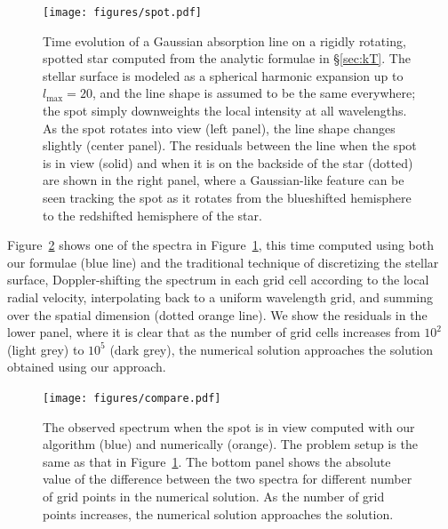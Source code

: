 \documentclass[modern]{aastex631}
\begin{document}
\begin{figure}[p!]
    \begin{centering}
        \texttt{[image: figures/spot.pdf]}
        \caption{%
            Time evolution of a Gaussian absorption line on a rigidly rotating, spotted star computed from the analytic formulae in \S\ref{sec:kT}.
            The stellar surface is modeled as a spherical harmonic expansion up to $l_\mathrm{max}=20$, and the line shape is assumed to be the same everywhere;
            the spot simply downweights the local intensity at all wavelengths.
            As the spot rotates into view (left panel), the line shape changes slightly (center panel). 
            The residuals between the line when the spot is in view (solid) and when it is on the backside of the star (dotted) are shown in the right panel, where a Gaussian-like feature can be seen tracking the spot as it rotates from the blueshifted hemisphere to the redshifted hemisphere of the star.
        }
        \label{fig:spot}
    \end{centering}
\end{figure}

Figure~\ref{fig:compare} shows one of the spectra in Figure~\ref{fig:spot}, this time computed using both our formulae (blue line) and the traditional technique of discretizing the stellar surface, Doppler-shifting the spectrum in each grid cell according to the local radial velocity, interpolating back to a uniform wavelength grid, and summing over the spatial dimension (dotted orange line). 
We show the residuals in the lower panel, where it is clear that as the number of grid cells increases from $10^2$ (light grey) to $10^5$ (dark grey), the numerical solution approaches the solution obtained using our approach.


\begin{figure}[t!]
    \begin{centering}
        \texttt{[image: figures/compare.pdf]}
        \caption{%
            The observed spectrum when the spot is in view computed with
            our algorithm (blue) and numerically (orange). 
            The problem setup is the same as that in Figure~\ref{fig:spot}. 
            The bottom panel shows the absolute value of the difference between the two spectra for different number of grid points in the numerical solution.
            As the number of grid points increases, the numerical solution approaches the \starry solution.
        }
        \label{fig:compare}
    \end{centering}
\end{figure}
\end{document}

